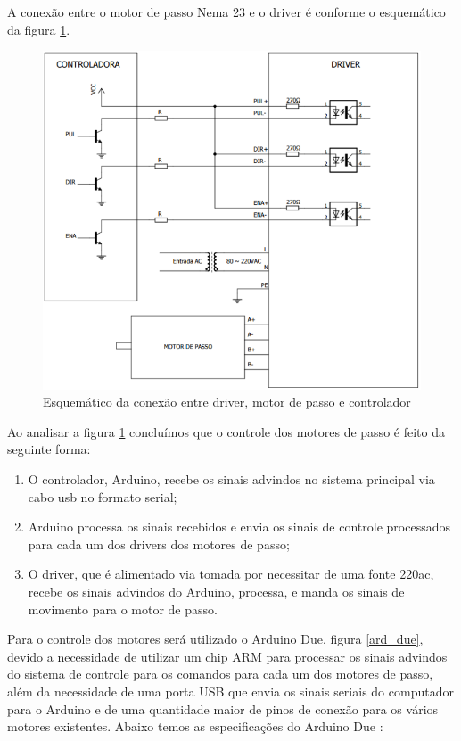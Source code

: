 A conexão entre o motor de passo Nema 23 e o driver é conforme o esquemático da figura \ref{des_fig16}.

\begin{figure}[H]
	\centering	\includegraphics[keepaspectratio=true,scale=0.6]{figuras/conexao_driver_controlador_motorpasso.png}
	\caption{Esquemático da conexão entre driver, motor de passo e controlador \cite{drivermanual}}
	\label{des_fig16}
\end{figure}

Ao analisar a figura \ref{des_fig16} concluímos que o controle dos motores de passo é feito da seguinte forma: 

\begin{enumerate}[noitemsep]
\item O controlador, Arduino, recebe os sinais advindos no sistema principal via cabo usb no formato serial;
\item Arduino processa os sinais recebidos e envia os sinais de controle processados para cada um dos drivers dos motores de passo;
\item O driver, que é alimentado via tomada por necessitar de uma fonte 220ac, recebe os sinais advindos do Arduino, processa, e manda os sinais de movimento para o motor de passo.
\end{enumerate}


Para o controle dos motores será utilizado o Arduino Due, figura \ref{ard_due}, devido a necessidade de utilizar um chip ARM para processar os sinais advindos do sistema de controle para os comandos para cada um dos motores de passo, além da necessidade de uma porta USB que envia os sinais seriais do computador para o Arduino e de uma quantidade maior de pinos de conexão para os vários motores existentes. Abaixo temos as especificações do Arduino Due \cite{arduinodue}:

